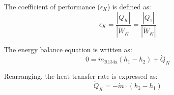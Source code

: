 The coefficient of performance (\(\epsilon_K\)) is defined as:  
\[
\epsilon_K = \frac{\left| \dot{Q}_K \right|}{\left| \dot{W}_K \right|} = \frac{\left| \dot{Q}_1 \right|}{\left| \dot{W}_K \right|}
\]

The energy balance equation is written as:  
\[
0 = \dot{m}_{\text{R134a}} \left( h_1 - h_2 \right) + \dot{Q}_K
\]

Rearranging, the heat transfer rate is expressed as:  
\[
\dot{Q}_K = -\dot{m} \cdot \left( h_2 - h_1 \right)
\]